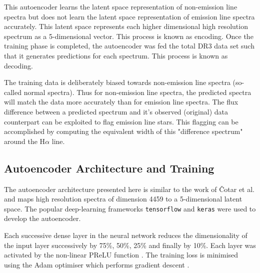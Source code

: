 This autoencoder learns the latent space representation of non-emission line spectra but does not learn the latent space representation of emission line spectra accurately. This latent space represents each higher dimensional high resolution spectrum as a 5-dimensional vector. This process is known as encoding. Once the training phase is completed, the autoencoder was fed the total DR3 data set such that it generates predictions for each spectrum. This process is known as decoding. 

The training data is deliberately biased towards non-emission line spectra (so-called normal spectra). Thus for non-emission line spectra, the predicted spectra will match the data more accurately than for emission line spectra. The flux difference between a predicted spectrum and it's observed (original) data counterpart can be exploited to flag emission line stars. This flagging can be accomplished by computing the equivalent width of this "difference spectrum" around the H$\alpha$ line.

\subsection{Autoencoder Architecture and Training}

The autoencoder architecture presented here is similar to the work of Čotar et al. and maps high resolution spectra of dimension 4459 to a 5-dimensional latent space. The popular deep-learning frameworks \texttt{tensorflow}\cite{tensorflow2015-whitepaper} and \texttt{keras}\cite{chollet2015keras} were used to develop the autoencoder.

Each successive dense layer in the neural network reduces the dimensionality of the input layer successively by 75\%, 50\%, 25\% and finally by 10\%. Each layer was activated by the non-linear PReLU function \cite{he2015delving}. The training loss is minimised using the Adam optimiser which performs gradient descent \cite{kingma2014adam}.

